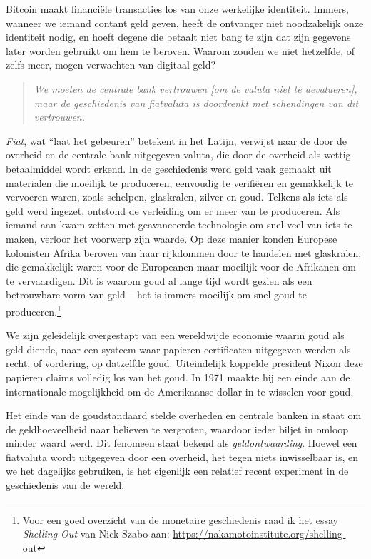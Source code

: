 Bitcoin maakt financiële transacties los van onze werkelijke identiteit. Immers, wanneer we iemand contant geld geven, heeft de ontvanger niet noodzakelijk onze identiteit nodig, en hoeft degene die betaalt niet bang te zijn dat zijn gegevens later worden gebruikt om hem te beroven. Waarom zouden we niet hetzelfde, of zelfs meer, mogen verwachten van digitaal geld?

\begin{quote}
\textit{We moeten de centrale bank vertrouwen [om de valuta niet te devalueren], maar de geschiedenis van fiatvaluta is doordrenkt met schendingen van dit vertrouwen.}
\end{quote}

\textit{Fiat}, wat ``laat het gebeuren'' betekent in het Latijn, verwijst naar de door de overheid en de centrale bank uitgegeven valuta, die door de overheid als wettig betaalmiddel wordt erkend. In de geschiedenis werd geld vaak gemaakt uit materialen die moeilijk te produceren, eenvoudig te verifiëren en gemakkelijk te vervoeren waren, zoals schelpen, glaskralen, zilver en goud. Telkens als iets als geld werd ingezet, ontstond de verleiding om er meer van te produceren. Als iemand aan kwam zetten met geavanceerde technologie om snel veel van iets te maken, verloor het voorwerp zijn waarde. Op deze manier konden Europese kolonisten Afrika beroven van haar rijkdommen door te handelen met glaskralen, die gemakkelijk waren voor de Europeanen maar moeilijk voor de Afrikanen om te vervaardigen. Dit is waarom goud al lange tijd wordt gezien als een betrouwbare vorm van geld -- het is immers moeilijk om snel goud te produceren.\footnote{Voor een goed overzicht van de monetaire geschiedenis raad ik het essay \textit{Shelling Out} van Nick Szabo aan: \href{https://nakamotoinstitute.org/shelling-out}{https://nakamotoinstitute.org/shelling-out}}

We zijn geleidelijk overgestapt van een wereldwijde economie waarin goud als geld diende, naar een systeem waar papieren certificaten uitgegeven werden als recht, of vordering, op datzelfde goud. Uiteindelijk koppelde president Nixon deze papieren claims volledig los van het goud. In 1971 maakte hij een einde aan de internationale mogelijkheid om de Amerikaanse dollar in te wisselen voor goud.

Het einde van de goudstandaard stelde overheden en centrale banken in staat om de geldhoeveelheid naar believen te vergroten, waardoor ieder biljet in omloop minder waard werd. Dit fenomeen staat bekend als \textit{geldontwaarding}. Hoewel een fiatvaluta wordt uitgegeven door een overheid, het tegen niets inwisselbaar is, en we het dagelijks gebruiken, is het eigenlijk een relatief recent experiment in de geschiedenis van de wereld.

